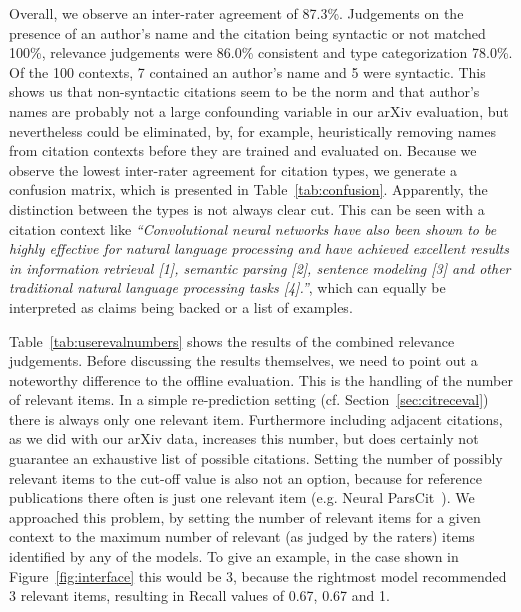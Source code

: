 Overall, we observe an inter-rater agreement of 87.3\%. Judgements on the presence of an author's name and the citation being syntactic or not matched 100\%, relevance judgements were 86.0\% consistent and type categorization 78.0\%. Of the 100 contexts, 7 contained an author's name and 5 were syntactic. This shows us that non-syntactic citations seem to be the norm and that author's names are probably not a large confounding variable in our arXiv evaluation, but nevertheless could be eliminated, by, for example, heuristically removing names from citation contexts before they are trained and evaluated on. Because we observe the lowest inter-rater agreement for citation types, we generate a confusion matrix, which is presented in Table~\ref{tab:confusion}. Apparently, the distinction between the types is not always clear cut. This can be seen with a citation context like \emph{``Convolutional neural networks have also been shown to be highly effective for natural language processing and have achieved excellent results in information retrieval [1], semantic parsing [2], sentence modeling [3] and other traditional natural language processing tasks [4].''}, which can equally be interpreted as claims being backed or a list of examples.

Table~\ref{tab:userevalnumbers} shows the results of the combined relevance judgements. Before discussing the results themselves, we need to point out a noteworthy difference to the offline evaluation. This is the handling of the number of relevant items. In a simple re-prediction setting (cf. Section~\ref{sec:citreceval}) there is always only one relevant item. Furthermore including adjacent citations, as we did with our arXiv data, increases this number, but does certainly not guarantee an exhaustive list of possible citations. Setting the number of possibly relevant items to the cut-off value is also not an option, because for reference publications there often is just one relevant item (e.g. Neural ParsCit~\cite{Animesh2018}). We approached this problem, by setting the number of relevant items for a given context to the maximum number of relevant (as judged by the raters) items identified by any of the models. To give an example, in the case shown in Figure~\ref{fig:interface} this would be 3, because the rightmost model recommended 3 relevant items, resulting in Recall values of 0.67, 0.67 and 1.

